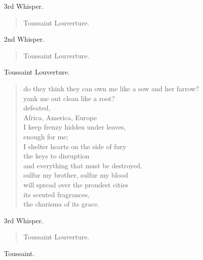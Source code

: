 \documentclass[letterpaper,article,12pt,oneside,notitlepage]{memoir}
\begin{document}
\begin{center}3rd Whisper.\end{center}

\begin{verse}
\hspace{1cm} Toussaint Louverture. \\
\end{verse}

\begin{center}2nd Whisper.\end{center}

\begin{verse}
\hspace{1cm} Toussaint Louverture. \\
\end{verse}

\begin{center}Toussaint Louverture.\end{center}

\begin{verse}
do they think they can own me like a sow and her farrow? \\
yank me out clean like a root? \\
defeated, \\
Africa, America, Europe \\
I keep frenzy hidden under leaves, \\
enough for me; \\
I shelter hearts on the side of fury \\
the keys to disruption \\
and everything that must be destroyed. \\
sulfur my brother, sulfur my blood \\
will spread over the proudest cities \\
its scented fragrances, \\
the charisma of its grace. \\
\end{verse}

\begin{center}3rd Whisper.\end{center}

\begin{verse}
\hspace{1cm} Toussaint Louverture. \\
\end{verse}

\begin{center}Toussaint.\end{center}
\end{document}
